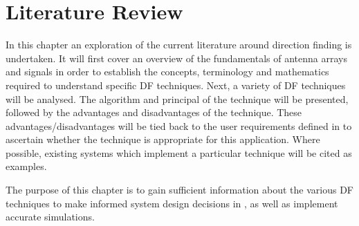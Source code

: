 \chapter{Literature Review}
\label{ch:lit-review}
In this chapter an exploration of the current literature around direction finding is undertaken.
It will first cover an overview of the fundamentals of antenna arrays and signals in order to establish the concepts, terminology and mathematics required to understand specific DF techniques. 
Next, a variety of DF techniques will be analysed. The algorithm and principal of the technique will be presented, followed by the advantages and disadvantages of the technique. 
These advantages/disadvantages will be tied back to the user requirements defined in  to ascertain whether the technique is appropriate for this application. Where possible, existing systems which implement a particular technique will be cited as examples.

The purpose of this chapter is to gain sufficient information about the various DF techniques to make informed system design decisions in , as well as implement accurate simulations.




